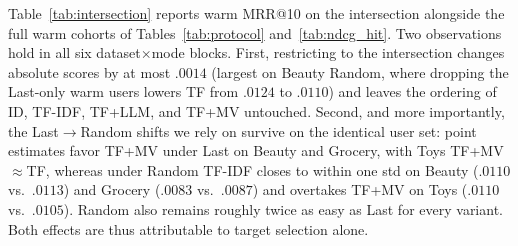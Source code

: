 \documentclass[sigconf,natbib=true,anonymous]{acmart}
\newcommand{\tfidf}{\textsc{TF-IDF}\xspace}
\newcommand{\tfllm}{\textsc{TF+LLM}\xspace}
\newcommand{\tfmv}{\textsc{TF+MV}\xspace}
\begin{document}
Table~\ref{tab:intersection} reports warm MRR@10 on the intersection alongside the full warm cohorts of Tables~\ref{tab:protocol} and~\ref{tab:ndcg_hit}.
Two observations hold in all six dataset$\times$mode blocks.
First, restricting to the intersection changes absolute scores by at most $.0014$ (largest on Beauty Random, where dropping the Last-only warm users lowers TF from $.0124$ to $.0110$) and leaves the ordering of ID, \tfidf, \tfllm, and \tfmv untouched.
Second, and more importantly, the Last$\to$Random shifts we rely on survive on the identical user set: point estimates favor \tfmv under Last on Beauty and Grocery, with Toys TF+MV${}\approx{}$TF, whereas under Random \tfidf closes to within one std on Beauty ($.0110$ vs.\ $.0113$) and Grocery ($.0083$ vs.\ $.0087$) and overtakes \tfmv on Toys ($.0110$ vs.\ $.0105$).
Random also remains roughly twice as easy as Last for every variant.
Both effects are thus attributable to target selection alone.
\end{document}
